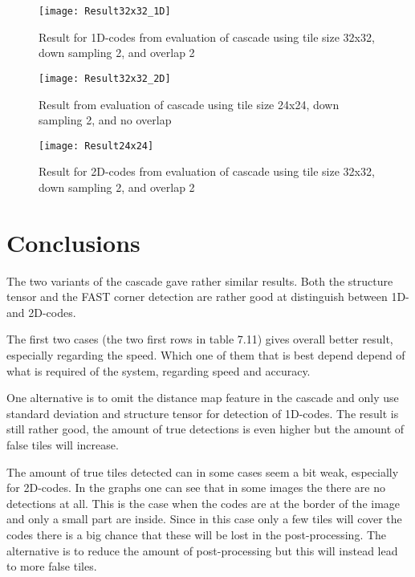 \begin{figure}[H]
\centering
	\texttt{[image: Result32x32\_1D]}
	\caption{Result for 1D-codes from evaluation of cascade using tile size 32x32, down sampling 2, and overlap 2}
	\label{Result32x32_1D}
\end{figure}

\begin{figure}[H]
\centering
	\texttt{[image: Result32x32\_2D]}
	\caption{Result from evaluation of cascade using tile size 24x24, down sampling 2, and no overlap}
	\label{Result24x24}
\end{figure}

\begin{figure}[H]
\centering
	\texttt{[image: Result24x24]}
	\caption{Result for 2D-codes from evaluation of cascade using tile size 32x32, down sampling 2, and overlap 2}
	\label{Result32x32_2D}
\end{figure}

\section{Conclusions}
\label{sec:Conclusions}
The two variants of the cascade gave rather similar results. Both the structure tensor and the FAST corner detection are rather good at distinguish between 1D- and 2D-codes.

The first two cases (the two first rows in table 7.11) gives overall better result, especially regarding the speed. Which one of them that is best depend depend of what is required of the system, regarding speed and accuracy.

One alternative is to omit the distance map feature in the cascade and only use standard deviation and structure tensor for detection of 1D-codes. The result is still rather good, the amount of true detections is even higher but the amount of false tiles will increase.

The amount of true tiles detected can in some cases seem a bit weak, especially for 2D-codes. In the graphs one can see that in some images the there are no detections at all. This is the case when the codes are at the border of the image and only a small part are inside. Since in this case only a few tiles will cover the codes there is a big chance that these will be lost in the post-processing. The alternative is to reduce the amount of post-processing but this will instead lead to more false tiles.  

